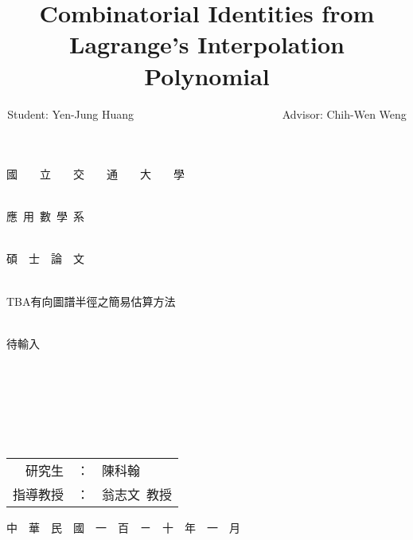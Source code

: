 \documentclass[12pt]{report}%
\title{Combinatorial Identities from Lagrange's Interpolation Polynomial}
\author{Student: Yen-Jung Huang  ~~~~~~~~~~~~~~~~~~~~~~~~~~Advisor: Chih-Wen Weng}
\date{} %
\theoremstyle{plain}
\theoremstyle{definition}
\begin{document}

\thispagestyle{empty}
\begin{center}
{ \Huge 國~~~~立~~~~交~~~~通~~~~大~~~~學}~\\~\\

\bigskip

{ \Huge 應~用~數~學~系}~\\~\\

\bigskip

{ \Huge 碩~~士~~論~~文}~\\~\\

\bigskip \bigskip\bigskip\bigskip\bigskip\bigskip

{ \Huge TBA有向圖譜半徑之簡易估算方法}~\\~\\

\bigskip

{ \Huge 待輸入}~\\~\\
~\\~\\~\\~\\~\\
\bigskip \bigskip\bigskip\bigskip\bigskip\bigskip
\bigskip \bigskip\bigskip\bigskip\bigskip\bigskip
\bigskip\bigskip\bigskip

{ \Large
\begin{tabular}{rcl}
研究生&：&陳科翰\\
指導教授&：&翁志文~教授
\end{tabular} }

\bigskip\bigskip
{ \Large 中~~華~~民~~國~~一~~百~~ㄧ~~十~~年~~一~~月 }
\large
\end{center}
\pagebreak
\end{document}
